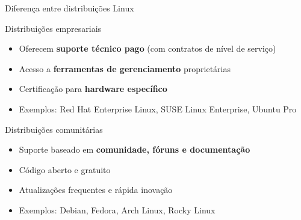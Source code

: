 \documentclass{if-beamer}
\begin{document}
\begin{frame}[allowframebreaks]{Diferença entre distribuições Linux}
	\begin{block}{Distribuições empresariais}
		\begin{itemize}
			\item Oferecem \textbf{suporte técnico pago} (com contratos de nível de serviço)
			\item Acesso a \textbf{ferramentas de gerenciamento} proprietárias
			\item Certificação para \textbf{hardware específico}
			\item Exemplos: Red Hat Enterprise Linux, SUSE Linux Enterprise, Ubuntu Pro
		\end{itemize}
	\end{block}
	
	\framebreak
	
	\begin{block}{Distribuições comunitárias}
		\begin{itemize}
			\item Suporte baseado em \textbf{comunidade, fóruns e documentação}
			\item Código aberto e gratuito
			\item Atualizações frequentes e rápida inovação
			\item Exemplos: Debian, Fedora, Arch Linux, Rocky Linux
		\end{itemize}
	\end{block}
\end{frame}


\end{document}
